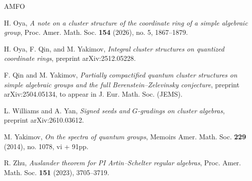\documentclass[11pt]{amsart}
\theoremstyle{plain}
\begin{document}
\begin{thebibliography}{AMFO}

 H. Oya, {\em{A note on a cluster structure of the coordinate ring of a simple algebraic group}}, Proc. Amer. Math. Soc. {\bf{154}} (2026), no. 5, 1867--1879.

 H. Oya, F. Qin, and M. Yakimov, 
{\em{Integral cluster structures on quantized coordinate rings}}, 
preprint arXiv:2512.05228.

 F. Qin and M. Yakimov, {\em{Partially compactified quantum cluster structures on simple algebraic groups and the full Berenstein--Zelevinsky conjecture}}, preprint arXiv:2504.05134, to appear in J. Eur. Math. Soc. (JEMS). 

 L. Williams and A. Yan, {\em{Signed seeds and $G$-gradings on cluster algebras}}, preprint arXiv:2610.03612. 

 M. Yakimov, {\em{On the spectra of quantum groups}}, Memoirs Amer. Math. Soc. {\bf{229}} (2014), no. 1078, vi + 91pp.

 R. Zhu, {\em{Auslander theorem for PI Artin--Schelter regular algebras}}, Proc. Amer. Math. Soc. {\bf{151}} (2023), 3705--3719.
\end{thebibliography}
\end{document}
